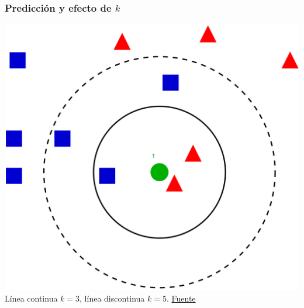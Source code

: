 \documentclass{beamer}
\begin{document}
\begin{frame}
\frametitle{Predicción y efecto de $k$}
\begin{center}
\includegraphics[height=0.68\textheight]{knn_class.png}
\vfill
{\footnotesize Línea continua $k=3$, línea discontinua $k=5$. \href{https://en.wikipedia.org/wiki/K-nearest_neighbors_algorithm}{Fuente}}
\end{center}
\end{frame}
\end{document}
